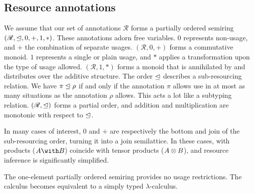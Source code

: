 \subsection{Resource annotations}
\label{sec:annotations}


We assume that our set of annotations $\mathscr R$ forms a partially ordered
semiring $(\mathscr{R}, \trianglelefteq, 0, +, 1, *)$.
These annotations adorn free variables.
$0$ represents non-usage, and $+$ the combination of separate usages.
$(\mathscr{R}, 0, +)$ forms a commutative monoid.
$1$ represents a single or plain usage, and $*$ applies a transformation upon
the type of usage allowed.
$(\mathscr{R}, 1, *)$ forms a monoid that is annihilated by and distributes over
the additive structure.
The order $\trianglelefteq$ describes a sub-resourcing relation.
We have $\pi \trianglelefteq \rho$ if and only if the annotation $\pi$ allows use in at
most as many situations as the annotation $\rho$ allows.
This acts a lot like a subtyping relation.
$(\mathscr{R}, \trianglelefteq)$ forms a partial order, and addition and multiplication
are monotonic with respect to $\trianglelefteq$.

In many cases of interest, $0$ and $+$ are respectively the bottom and join of
the sub-resourcing order, turning it into a join semilattice.
In these cases, with products ($\withT{A}{B}$) coincide with tensor products
($A \otimes B$), and resource inference is significantly simplified.
 


\begin{example}[Trivial]
  The one-element partially ordered semiring provides no usage restrictions.
  The calculus becomes equivalent to a simply typed $\lambda$-calculus.
\end{example}

